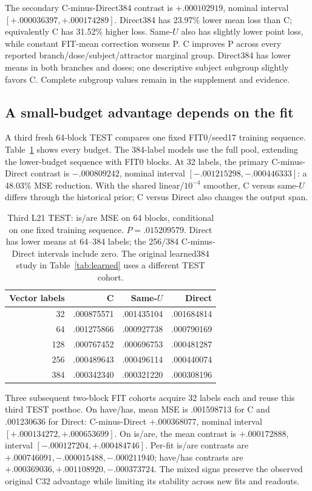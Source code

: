 \documentclass[11pt]{article}
\begin{document}
The secondary C-minus-Direct384 contrast is $+.000102919$, nominal interval $[+.000036397,+.000174289]$. Direct384 has 23.97\% lower mean loss than C; equivalently C has 31.52\% higher loss. Same-$U$ also has slightly lower point loss, while constant FIT-mean correction worsens P. C improves P across every reported branch/dose/subject/attractor marginal group. Direct384 has lower means in both branches and doses; one descriptive subject subgroup slightly favors C. Complete subgroup values remain in the supplement and evidence.

\subsection{A small-budget advantage depends on the fit}
A third fresh 64-block TEST compares one fixed FIT0/seed17 training sequence. Table~\ref{tab:budget} shows every budget. The 384-label models use the full pool, extending the lower-budget sequence with FIT0 blocks. At 32 labels, the primary C-minus-Direct contrast is $-.000809242$, nominal interval $[-.001215298,-.000446333]$: a 48.03\% MSE reduction. With the shared linear/$10^{-4}$ smoother, C versus same-$U$ differs through the historical prior; C versus Direct also changes the output span.

\begin{table}[ht]\centering\small
\begin{tabular}{rrrr}\toprule Vector labels & C & Same-$U$ & Direct\\\midrule
32 & .000875571 & .001435104 & .001684814\\
64 & .001275866 & .000927738 & .000790169\\
128 & .000767452 & .000696753 & .000481287\\
256 & .000489643 & .000496114 & .000440074\\
384 & .000342340 & .000321220 & .000308196\\\bottomrule\end{tabular}
\caption{Third L21 TEST: is/are MSE on 64 blocks, conditional on one fixed training sequence. $P=.015209579$. Direct has lower means at 64--384 labels; the 256/384 C-minus-Direct intervals include zero. The original learned384 study in Table~\ref{tab:learned} uses a different TEST cohort.}\label{tab:budget}
\end{table}

Three subsequent two-block FIT cohorts acquire 32 labels each and reuse this third TEST posthoc. On have/has, mean MSE is .001598713 for C and .001230636 for Direct: C-minus-Direct $+.000368077$, nominal interval $[+.000134272,+.000653699]$. On is/are, the mean contrast is $+.000172888$, interval $[-.000127204,+.000484746]$. Per-fit is/are contrasts are $+.000746091,-.000015488,-.000211940$; have/has contrasts are $+.000369036,+.001108920,-.000373724$. The mixed signs preserve the observed original C32 advantage while limiting its stability across new fits and readouts.
\end{document}
